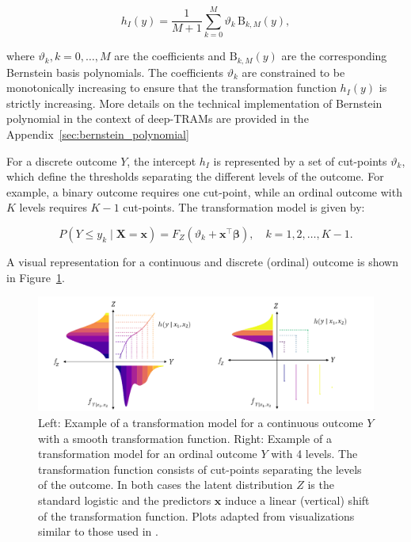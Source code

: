 \begin{equation}
h_I(y) = \frac{1}{M + 1} \sum_{k=0}^{M} \vartheta_k \, \text{B}_{k, M}(y),
\label{eq:methods_bernstein_polynomial}
\end{equation}

where $\vartheta_k, k = 0, \ldots, M$ are the coefficients and $\text{B}_{k, M}(y)$ are the corresponding Bernstein basis polynomials. The coefficients $\vartheta_k$ are constrained to be monotonically increasing to ensure that the transformation function $h_I(y)$ is strictly increasing. More details on the technical implementation of Bernstein polynomial in the context of deep-TRAMs are provided in the Appendix~\ref{sec:bernstein_polynomial}






For a discrete outcome $Y$, the intercept $h_I$ is represented by a set of cut-points $\vartheta_k$, which define the thresholds separating the different levels of the outcome. For example, a binary outcome requires one cut-point, while an ordinal outcome with $K$ levels requires $K-1$ cut-points. The transformation model is given by:

\begin{equation}
P(Y \leq y_k \mid \mathbf{X} = \mathbf{x}) = F_Z(\vartheta_k + \mathbf{x}^\top \boldsymbol{\beta}), \quad k = 1, 2, \ldots, K - 1.
\end{equation}


A visual representation for a continuous and discrete (ordinal) outcome is shown in Figure~\ref{fig:tram_cont_ord}.


\begin{figure}[H]
\centering
\includegraphics[width=1\textwidth]{img/tram_cont_ord.png}
\caption{Left: Example of a transformation model for a continuous outcome $Y$ with a smooth transformation function. Right: Example of a transformation model for an ordinal outcome $Y$ with 4 levels. The transformation function consists of cut-points separating the levels of the outcome.
In both cases the latent distribution $Z$ is the standard logistic and the predictors $\mathbf{x}$ induce a linear (vertical) shift of the transformation function. Plots adapted from visualizations similar to those used in \citet{sick2025}.}
\label{fig:tram_cont_ord}
\end{figure}


